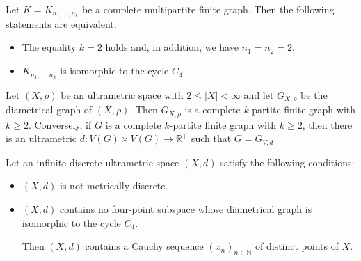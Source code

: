 \documentclass[10pt,a4paper]{amsart}
\begin{document}
\begin{corollary}\label{renjh}
Let $K=K_{n_1,\ldots,n_k}$ be a complete multipartite finite graph. 
Then the following statements are equivalent:
\begin{itemize}[left=10pt]
    \item[(i)] The equality $k=2$ holds and, in addition, we have  $n_1=n_2=2$.

    \item[(ii)] $K_{n_1,\ldots,n_k}$ is isomorphic to the cycle $C_4$.
\end{itemize} 
\end{corollary}

\begin{theorem}\label{thm:3.1}
Let $(X,\rho)$ be an ultrametric space with $2\leq |X |<\infty$
and let $G_{X,\rho}$ be the diametrical graph of $(X,\rho)$.
Then $G_{X,\rho}$ is a complete $k$-partite finite graph with $k\geq 2$. Conversely, if $G$ is a complete 
$k$-partite finite graph with $k\geq 2$, then there is an ultrametric 
$d \colon V(G) \times V(G) \to \mathbb{R}^+$ such that $G=G_{V,d}$.
\end{theorem}

\begin{lemma}\label{476}
Let an infinite discrete ultrametric space $(X,d)$ satisfy the following conditions:
\begin{itemize}[left=10pt]
    \item[(i)] $(X,d)$ is not metrically discrete.

        \item[(ii)]  $(X,d)$ contains no four-point subspace whose diametrical graph is isomorphic to the cycle $C_4$.

Then $(X,d)$  contains a Cauchy sequence $(x_n)_{n\in \mathbb N}$ of distinct points of $X$.
\end{itemize}

\end{lemma}
\end{document}

